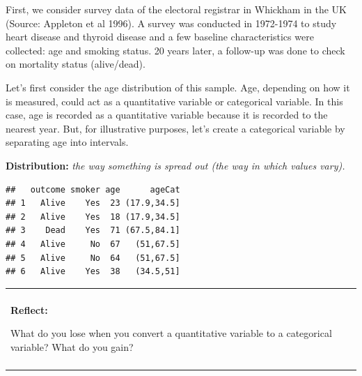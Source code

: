 \documentclass[
]{book}
\newenvironment{Shaded}{\begin{snugshade}}{\end{snugshade}}
\newcommand{\CommentTok}[1]{\textcolor[rgb]{0.56,0.35,0.01}{\textit{#1}}}
\newcommand{\DataTypeTok}[1]{\textcolor[rgb]{0.13,0.29,0.53}{#1}}
\newcommand{\DecValTok}[1]{\textcolor[rgb]{0.00,0.00,0.81}{#1}}
\newcommand{\KeywordTok}[1]{\textcolor[rgb]{0.13,0.29,0.53}{\textbf{#1}}}
\newcommand{\NormalTok}[1]{#1}
\newcommand{\OperatorTok}[1]{\textcolor[rgb]{0.81,0.36,0.00}{\textbf{#1}}}
\newcommand{\StringTok}[1]{\textcolor[rgb]{0.31,0.60,0.02}{#1}}
\newenvironment{reflect}
{
    \begin{center}
    
    \begin{tabular}{|p{0.8\textwidth}|}
    \rowcolor{LightBlue}
    \hline\\
    \rowcolor{LightBlue}
    \textbf{Reflect:}
}
{
    \\\rowcolor{LightBlue}
    \\\hline
    \end{tabular} 
    \end{center}
}
\begin{document}
First, we consider survey data of the electoral registrar in Whickham in the UK (Source: Appleton et al 1996). A survey was conducted in 1972-1974 to study heart disease and thyroid disease and a few baseline characteristics were collected: age and smoking status. 20 years later, a follow-up was done to check on mortality status (alive/dead).

Let's first consider the age distribution of this sample. Age, depending on how it is measured, could act as a quantitative variable or categorical variable. In this case, age is recorded as a quantitative variable because it is recorded to the nearest year. But, for illustrative purposes, let's create a categorical variable by separating age into intervals.

\textbf{Distribution:} \emph{the way something is spread out (the way in which values vary).}

\begin{Shaded}
\end{Shaded}

\begin{verbatim}
##   outcome smoker age      ageCat
## 1   Alive    Yes  23 (17.9,34.5]
## 2   Alive    Yes  18 (17.9,34.5]
## 3    Dead    Yes  71 (67.5,84.1]
## 4   Alive     No  67   (51,67.5]
## 5   Alive     No  64   (51,67.5]
## 6   Alive    Yes  38   (34.5,51]
\end{verbatim}

\begin{reflect}
What do you lose when you convert a quantitative variable to a
categorical variable? What do you gain?
\end{reflect}
\end{document}
